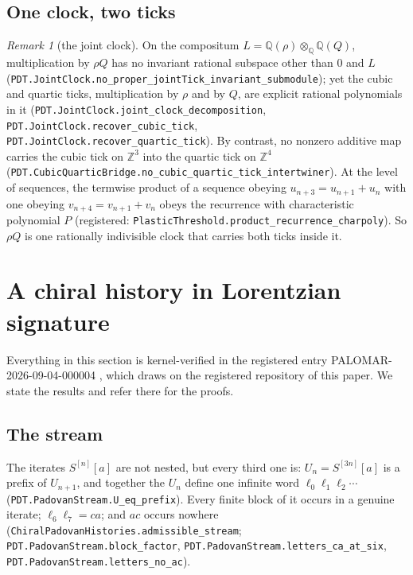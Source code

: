 \documentclass[11pt]{amsart}
\theoremstyle{plain}
\theoremstyle{definition}
\theoremstyle{remark}
\newtheorem{remark}[theorem]{Remark}
\begin{document}
\subsection{One clock, two ticks}

\begin{remark}[the joint clock]\label{rem:jointclock}
On the compositum $L = \mathbb{Q}(\rho) \otimes_{\mathbb{Q}} \mathbb{Q}(Q)$, multiplication
by $\rho Q$ has no invariant rational subspace other than $0$ and $L$
(\texttt{PDT.JointClock.no\_proper\_jointTick\_invariant\_submodule}); yet the cubic and
quartic ticks, multiplication by $\rho$ and by $Q$, are explicit rational polynomials in it
(\texttt{PDT.JointClock.joint\_clock\_decomposition},
\texttt{PDT.JointClock.recover\_cubic\_tick}, \texttt{PDT.JointClock.recover\_quartic\_tick}).
By contrast, no nonzero additive map carries the cubic tick on $\mathbb{Z}^3$ into the quartic
tick on $\mathbb{Z}^4$ (\texttt{PDT.CubicQuarticBridge.no\_cubic\_quartic\_tick\_intertwiner}).
At the level of sequences, the termwise product of a sequence obeying
$u_{n+3} = u_{n+1} + u_n$ with one obeying $v_{n+4} = v_{n+1} + v_n$ obeys the recurrence with
characteristic polynomial $P$ (registered: \texttt{PlasticThreshold.product\_recurrence\_charpoly}).
So $\rho Q$ is one rationally indivisible clock that carries both ticks inside it.
\end{remark}

\section{A chiral history in Lorentzian signature}
\label{sec:lorentz}

Everything in this section is kernel-verified in the registered entry
PALOMAR-2026-09-04-000004 \cite{palomar-cph}, which draws on the registered repository of this
paper. We state the results and refer there for the proofs.

\subsection{The stream}

The iterates $S^{[n]}[a]$ are not nested, but every third one is: $U_n = S^{[3n]}[a]$ is a
prefix of $U_{n+1}$, and together the $U_n$ define one infinite word
$\ell_0 \ell_1 \ell_2 \cdots$ (\texttt{PDT.PadovanStream.U\_eq\_prefix}). Every finite block
of it occurs in a genuine iterate; $\ell_6 \ell_7 = ca$; and $ac$ occurs nowhere
(\texttt{ChiralPadovanHistories.admissible\_stream}; \texttt{PDT.PadovanStream.block\_factor},
\texttt{PDT.PadovanStream.letters\_ca\_at\_six}, \texttt{PDT.PadovanStream.letters\_no\_ac}).
\end{document}
